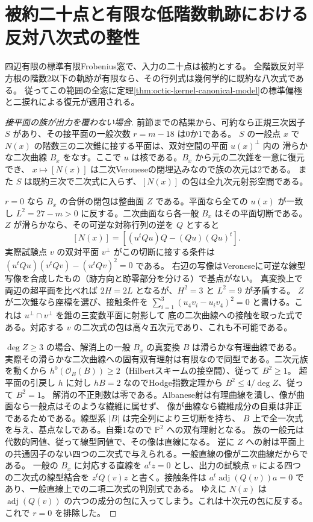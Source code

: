 \section{被約二十点と有限な低階数軌跡における反対八次式の整性}
\label{sec:clean-octic-integrality}
\begin{theorem}\label{thm:clean-octic-integrality}
四辺有限の標準有限Frobenius窓で、入力の二十点は被約とする。
全階数反対平方根の階数2以下の軌跡が有限なら、その行列式は幾何学的に既約な八次式である。
従ってこの範囲の全窓に定理\ref{thm:octic-kernel-canonical-model}の標準偏極と二捩れによる復元が適用される。
\end{theorem}
\begin{proof}[接平面の族が出力を覆わない場合]
前節までの結果から、可約なら正規三次因子 $S$ があり、その接平面の一般次数 $r=m-18$ は0か1である。
$S$ の一般点 $x$ で $N(x)$ の階数三の二次錐に接する平面は、双対空間の平面 $u(x)^\perp$ 内の
滑らかな二次曲線 $B_x$ をなす。ここで $u$ は核である。$B_x$ から元の二次錐を一意に復元でき、
$x\mapsto[N(x)]$ は二次Veroneseの閉埋込みなので族の次元は2である。
また $S$ は既約三次で二次式に入らず、$[N(x)]$ の包は全九次元射影空間である。

$r=0$ なら $B_x$ の合併の閉包は整曲面 $Z$ である。平面なら全ての $u(x)$ が一致し
$L^2=27-m>0$ に反する。二次曲面なら各一般 $B_x$ はその平面切断である。
$Z$ が滑らかなら、その可逆な対称行列の逆を $Q$ とすると
\[
              [N(x)]=[(u^tQ u)Q-(Qu)(Qu)^t] .
\]
実際試験点 $v$ の双対平面 $v^\perp$ がこの切断に接する条件は
$(u^tQu)(v^tQv)-(u^tQv)^2=0$ である。
右辺の写像はVeroneseに可逆な線型写像を合成したもの（跡方向と跡零部分を分ける）で基点がない。
真変換上で両辺の超平面を比べれば $2H=2L$ となるが、$H^2=3$ と $L^2=9$ が矛盾する。
$Z$ が二次錐なら座標を選び、接触条件を
$\sum_{i=1}^3(u_4v_i-u_iv_4)^2=0$ と書ける。これは $u^\perp\cap v^\perp$ を錐の三変数平面に射影して
底の二次曲線への接触を取った式である。対応する $v$ の二次式の包は高々五次元であり、これも不可能である。

$\deg Z\ge3$ の場合、解消上の一般 $B_x$ の真変換 $B$ は滑らかな有理曲線である。
実際その滑らかな二次曲線への固有双有理射は有限なので同型である。二次元族を動くから
$h^0(\mathcal O_B(B))\ge2$（Hilbertスキームの接空間）、従って $B^2\ge1$。
超平面の引戻し $h$ に対し $hB=2$ なのでHodge指数定理から $B^2\le4/\deg Z$、従って $B^2=1$。
解消の不正則数は零である。Albanese射は有理曲線を潰し、像が曲面なら一般点はそのような繊維に属せず、
像が曲線なら繊維成分の自乗は非正であるためである。線型系 $|B|$ は完全列により三切断を持ち、
$B$ 上で全一次式を与え、基点なしである。自乗1なので $\mathbb P^2$ への双有理射となる。
族の一般元は代数的同値、従って線型同値で、その像は直線になる。
逆に $Z$ への射は平面上の共通因子のない四つの二次式で与えられる。一般直線の像が二次曲線だからである。
一般の $B_x$ に対応する直線を $a^t z=0$ とし、出力の試験点 $v$ による四つの二次式の線型結合を
$z^t Q(v)z$ と書く。接触条件は $a^t\operatorname{adj}(Q(v))a=0$ であり、一般直線上での二項二次式の判別式である。
ゆえに $N(x)$ は $\operatorname{adj}(Q(v))$ の六つの成分の包に入ってしまう。これは十次元の包に反する。
これで $r=0$ を排除した。
\end{proof}
